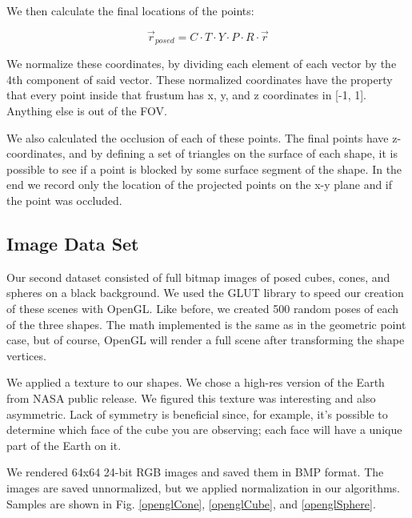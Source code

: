 \documentclass[journal]{IEEEtran}
\begin{document}
We then calculate the final locations of the points:

\begin{equation}
\vec r_{posed} = C \cdot T \cdot Y \cdot P \cdot R \cdot \vec r
\end{equation}

We normalize these coordinates, by dividing each element of each vector by the 4th component of said vector. These normalized coordinates have the property that every point inside that frustum has x, y, and z coordinates in [-1, 1]. Anything else is out of the FOV.

We also calculated the occlusion of each of these points. The final points have z-coordinates, and by defining a set of triangles on the surface of each shape, it is possible to see if a point is blocked by some surface segment of the shape. In the end we record only the location of the projected points on the x-y plane and if the point was occluded.

\subsection{Image Data Set}
Our second dataset consisted of full bitmap images of posed cubes, cones, and spheres on a black background. We used the GLUT library to speed our creation of these scenes with OpenGL. Like before, we created 500 random poses of each of the three shapes. The math implemented is the same as in the geometric point case, but of course, OpenGL will render a full scene after transforming the shape vertices.

We applied a texture to our shapes. We chose a high-res version of the Earth from NASA public release. We figured this texture was interesting and also asymmetric. Lack of symmetry is beneficial since, for example, it's possible to determine which face of the cube you are observing; each face will have a unique part of the Earth on it.

We rendered 64x64 24-bit RGB images and saved them in BMP format. The images are saved unnormalized, but we applied normalization in our algorithms.
Samples are shown in Fig. \ref{openglCone}, \ref{openglCube}, and \ref{openglSphere}.
\end{document}
